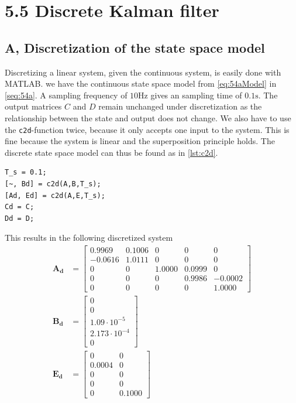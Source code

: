 \section{5.5 Discrete Kalman filter}
\subsection{A, Discretization of the state space model}
Discretizing a linear system, given the continuous system, is easily done with MATLAB. we have the continuous state space model from \eqref{eq:54aModel} in \autoref{seq:54a}. A sampling frequency of  $10 \si{\hertz}$ gives an sampling time of $0.1 \si{\second}$. The output matrices $C$ and $D$ remain unchanged under discretization as the relationship between the state and output does not change. We also have to use the \lstinline{c2d}-function twice, because it only accepts one input to the system. This is fine because the system is linear and the superposition principle holds. The discrete state space model can thus be found as in \autoref{lst:c2d}.
\begin{lstlisting}[caption={MATLAB script to find discretize a continuous state space model.}, label={lst:c2d}]
T_s = 0.1;
[~, Bd] = c2d(A,B,T_s);
[Ad, Ed] = c2d(A,E,T_s);
Cd = C;
Dd = D;
\end{lstlisting}
This results in the following discretized system
\begin{subequations}
\begin{align}
    \mathbf{A_d} &= 
    \begin{bmatrix}
        0.9969 & 0.1006 & 0 & 0 & 0\\
        -0.0616 & 1.0111 & 0 & 0 & 0\\
        0 & 0 & 1.0000 & 0.0999 & 0\\
        0 & 0 & 0 & 0.9986 & -0.0002\\
        0 & 0 & 0 & 0 & 1.0000
    \end{bmatrix}\\
    \mathbf{B_d} &= 
    \begin{bmatrix}
        0\\
        0\\
        1.09\cdot 10^{-5}\\
        2.173\cdot 10^{-4}\\
        0
    \end{bmatrix}\\
    \mathbf{E_d} &= 
    \begin{bmatrix}
        0 & 0\\
        0.0004 & 0\\
        0 & 0\\
        0 & 0\\
        0 & 0.1000
    \end{bmatrix}
\end{align}
\end{subequations}
